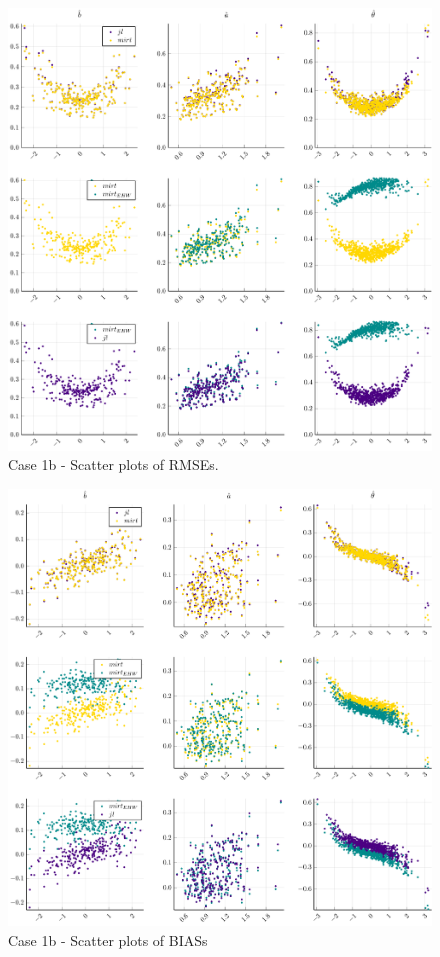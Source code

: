 \begin{figure}[H] 
	\centering
	\includegraphics[width=\textwidth]{Figures/1b/RMSEscatter.pdf}
	\caption{Case 1b - Scatter plots of RMSEs.}
	\label{fig:spRMSE1b}
\end{figure}
\begin{figure}[H] 
	\centering
	\includegraphics[width=\textwidth]{Figures/1b/BIASscatter.pdf}
	\caption{Case 1b - Scatter plots of BIASs }
	\label{fig:spBIAS1b}
\end{figure}

